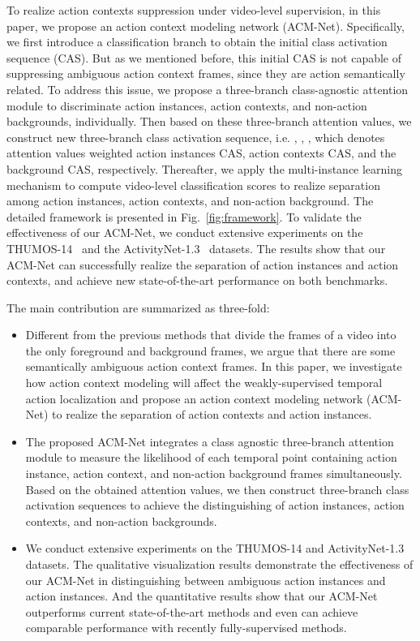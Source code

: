 \documentclass[journal,comsoc]{IEEEtran}
\begin{document}
\par To realize action contexts suppression under video-level supervision, in this paper, we propose an action context modeling network (ACM-Net). Specifically, we first introduce a classification branch to obtain the initial class activation sequence (CAS). But as we mentioned before, this initial CAS is not capable of suppressing ambiguous action context frames, since they are action semantically related. To address this issue, we propose a three-branch class-agnostic attention module to discriminate action instances, action contexts, and non-action backgrounds, individually. Then based on these three-branch attention values, we construct new three-branch class activation sequence, i.e. , , , which denotes attention values weighted action instances CAS, action contexts CAS, and the background CAS, respectively. Thereafter, we apply the multi-instance learning mechanism to compute video-level classification scores to realize separation among action instances, action contexts, and non-action background. The detailed framework is presented in Fig.~\ref{fig:framework}. To validate the effectiveness of our ACM-Net, we conduct extensive experiments on the THUMOS-14~\cite{thu14_dataset} and the ActivityNet-1.3~\cite{Activitynet} datasets. The results show that our ACM-Net can successfully realize the separation of action instances and action contexts, and achieve new state-of-the-art performance on both benchmarks.

\par The main contribution are summarized as three-fold:
\begin{itemize}
    \item Different from the previous methods that divide  the frames of a video into the only foreground and background frames, we argue that there are some semantically ambiguous action context frames. In this paper, we investigate how action context modeling will affect the weakly-supervised temporal action localization and propose an action context modeling network (ACM-Net) to realize the separation of action contexts and action instances.

    \item The proposed ACM-Net integrates a class agnostic three-branch attention module to measure the likelihood of each temporal point containing action instance, action context, and non-action background frames simultaneously. Based on the obtained attention values, we then construct three-branch class activation sequences to achieve the distinguishing of action instances, action contexts, and non-action backgrounds.
    
    \item We conduct extensive experiments on the THUMOS-14 and ActivityNet-1.3 datasets. The qualitative visualization results demonstrate the effectiveness of our ACM-Net in distinguishing between ambiguous action instances and action instances. And the quantitative results show that our ACM-Net outperforms current state-of-the-art methods and even can achieve comparable performance with recently fully-supervised methods.
\end{itemize}
\end{document}
